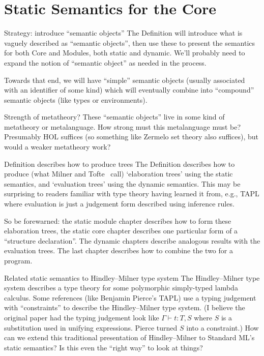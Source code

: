 \chapter{Static Semantics for the Core}

\begin{remark}{Strategy: introduce ``semantic objects''}
The Definition will introduce what is vaguely described as ``semantic
objects'', then use these to present the semantics for both Core and
Modules, both static and dynamic. We'll probably need to expand the
notion of ``semantic object'' as needed in the process.

Towards that end, we will have ``simple'' semantic objects (usually
associated with an identifier of some kind) which will
eventually combine into ``compound'' semantic objects (like types or
environments). 
\end{remark}

\begin{puzzle}{Strength of metatheory?}
These ``semantic objects'' live in some kind of metatheory or
metalanguage. How strong must this metalanguage must be? Presumably
HOL suffices (so something like Zermelo set theory also suffices), but
would a weaker metatheory work?
\end{puzzle}

\begin{remark}{Definition describes how to produce trees}
The Definition describes how to produce (what Milner and Tofte~\cite{milner1991commentary} call)
`elaboration trees' using the static semantics, and `evaluation trees' 
using the dynamic semantics. This may be surprising to readers familiar
with type theory having learned it from, e.g., TAPL where evaluation is
just a judgement form described using inference rules.

So be forewarned: the static module chapter describes how to form these
elaboration trees, the static core chapter describes one particular form
of a ``structure declaration''. The dynamic chapters describe analogous
results with the evaluation trees. The last chapter describes how to
combine the two for a program.
\end{remark}

\begin{puzzle}{Related static semantics to Hindley--Milner type system}
The Hindley--Milner type system describes a type theory for some
polymorphic simply-typed lambda calculus. Some references (like
Benjamin Pierce's TAPL) use a typing judgement with ``constraints'' to
describe the Hindley--Milner type system. (I believe the original
paper had the typing judgement look like $\Gamma\vdash t:T,S$ where
$S$ is a substitution used in unifying expressions. Pierce turned $S$
into a constraint.) How can we extend this traditional presentation of
Hindley--Milner to Standard ML's static semantics? Is this even the
``right way'' to look at things?
\end{puzzle}

